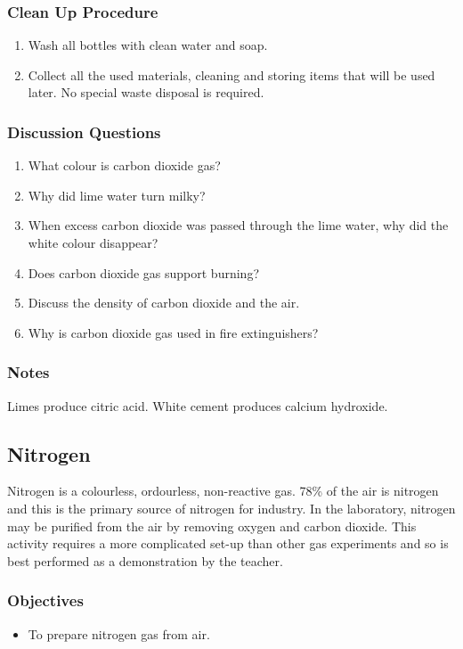 \subsubsection*{Clean Up Procedure}
\begin{enumerate}
\item{Wash all bottles with clean water and soap.}
\item{Collect all the used materials, cleaning and storing items that will be used later. No special waste disposal is required.}
\end{enumerate}

\subsubsection*{Discussion Questions}
\begin{enumerate}
\item{What colour is carbon dioxide gas?}
\item{Why did lime water turn milky?}
\item{When excess carbon dioxide was passed through the lime water, why did the white colour disappear?}
\item{Does carbon dioxide gas support burning?}
\item{Discuss the density of carbon dioxide and the air.}
\item{Why is carbon dioxide gas used in fire extinguishers?}
\end{enumerate}

\subsubsection*{Notes}
Limes produce citric acid. White cement produces calcium hydroxide.

\subsection{Nitrogen}

Nitrogen is a colourless, ordourless, non-reactive gas. 78\% of the air is nitrogen and this is the primary source of nitrogen for industry. In the laboratory, nitrogen may be purified from the air by removing oxygen and carbon dioxide. This activity requires a more complicated set-up than other gas experiments and so is best performed as a demonstration by the teacher.

\subsubsection*{Objectives}
\begin{itemize}
\item{To prepare nitrogen gas from air.}
\end{itemize}

